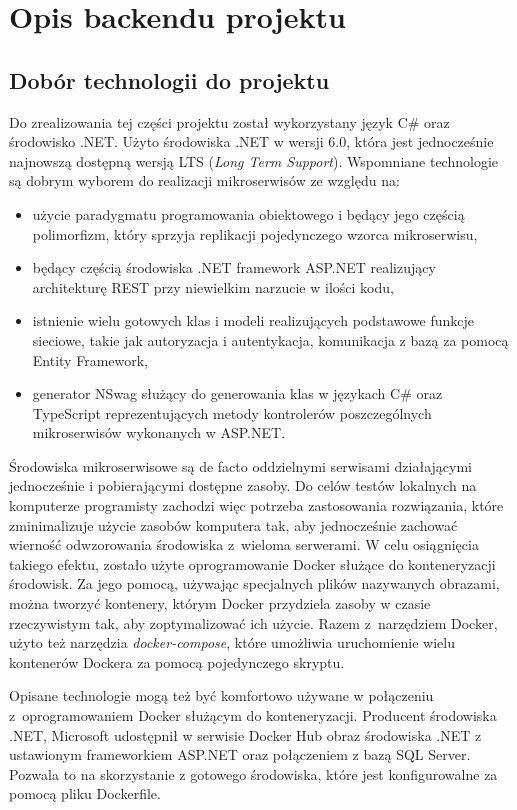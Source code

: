 \documentclass{SGGW-thesis}
\begin{document}
{\chapter{Opis backendu projektu}
\section{Dobór technologii do projektu}
Do zrealizowania tej części projektu został wykorzystany język C\# oraz środowisko .NET. Użyto środowiska .NET w wersji 6.0, która jest jednocześnie najnowszą dostępną wersją LTS (\textit{Long Term Support}). Wspomniane technologie są dobrym wyborem do realizacji mikroserwisów ze względu na:

\begin{itemize}
	\item użycie paradygmatu programowania obiektowego i będący jego częścią polimorfizm, który sprzyja replikacji pojedynczego wzorca mikroserwisu,
	\item będący częścią środowiska .NET framework ASP.NET realizujący architekturę REST przy niewielkim narzucie w ilości kodu,
	\item istnienie wielu gotowych klas i modeli realizujących podstawowe funkcje sieciowe, takie jak autoryzacja i autentykacja, komunikacja z bazą za pomocą Entity Framework,
	\item generator NSwag służący do generowania klas w językach C\# oraz TypeScript reprezentujących metody kontrolerów poszczególnych mikroserwisów wykonanych w ASP.NET.
\end{itemize}

Środowiska mikroserwisowe są de facto oddzielnymi serwisami działającymi jednocześnie i pobierającymi dostępne zasoby. Do celów testów lokalnych na komputerze programisty zachodzi więc potrzeba zastosowania rozwiązania, które zminimalizuje użycie zasobów komputera tak, aby jednocześnie zachować wierność odwzorowania środowiska z~wieloma serwerami. W celu osiągnięcia takiego efektu, zostało użyte oprogramowanie Docker służące do konteneryzacji środowisk. Za jego pomocą, używając specjalnych plików nazywanych obrazami, można tworzyć kontenery, którym Docker przydziela zasoby w czasie rzeczywistym tak, aby zoptymalizować ich użycie.
Razem z~narzędziem Docker, użyto też narzędzia \textit{docker-compose}, które umożliwia uruchomienie wielu kontenerów Dockera za pomocą pojedynczego skryptu.

Opisane technologie mogą też być komfortowo używane w połączeniu z~oprogramowaniem Docker służącym do konteneryzacji. Producent środowiska .NET, Microsoft udostępnił w serwisie Docker Hub obraz środowiska .NET z ustawionym frameworkiem ASP.NET oraz połączeniem z bazą SQL Server. Pozwala to na skorzystanie z gotowego środowiska, które jest konfigurowalne za pomocą pliku Dockerfile.

}
\end{document}
